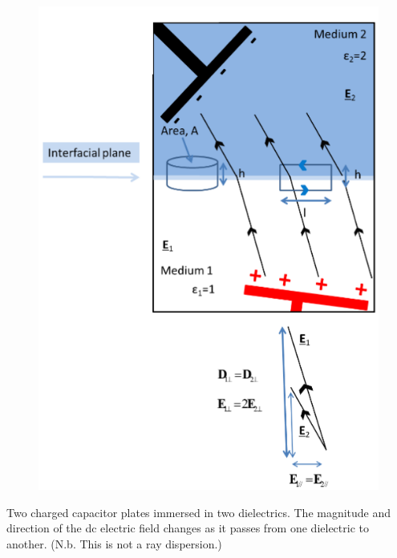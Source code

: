 \documentclass[a4paper, 11pt, normalem]{report}
\begin{document}
\begin{figure}[H]
  	\centering
  	\includegraphics[scale=0.4]{wolfgang.png}
\end{figure}

Two charged capacitor plates immersed in two dielectrics.
The magnitude and direction of the dc electric field changes as it passes from one dielectric to another.
(N.b. This is not a ray dispersion.)
\end{document}
